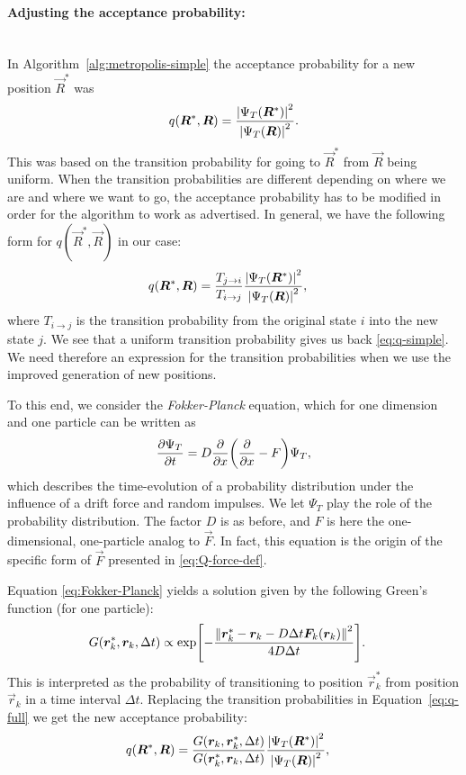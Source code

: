 \documentclass[twocolumn]{article}
\begin{document}
\paragraph{Adjusting the acceptance probability:}$\,$\\
In Algorithm~\ref{alg:metropolis-simple} the acceptance probability for a new
position $\vec R^*$ was
\begin{align}
    q(\bm R^*, \bm R) = \frac{\abs{\Psi_T(\bm R^*)}^2}{\abs{\Psi_T(\bm
    R)}^2}\label{eq:q-simple}.
\end{align}
This was based on the transition probability for going to $\vec R^*$ from $\vec
R$ being uniform. When the transition probabilities are different depending on 
where we are and where we want to go, the acceptance probability has to be
modified in order for the algorithm to work as advertised. In general, we have 
the following form for $q(\vec R^*, \vec R)$ in our case:
\begin{align}
    q(\bm R^*, \bm R) &= \frac{T_{j\rightarrow i}}{T_{i\rightarrow j}}\frac{\abs{\Psi_T(\bm R^*)}^2}{\abs{\Psi_T(\bm
    R)}^2},\label{eq:q-full}
\end{align}
where $T_{i\rightarrow j}$ is the transition probability from the original state
$i$ into the new state $j$. We see that a uniform transition probability gives
us back \eqref{eq:q-simple}. We need therefore an expression for the transition
probabilities when we use the improved generation of new positions.


To this end, we consider the \textit{Fokker-Planck} equation, which for one
dimension and one particle can be written as
\begin{align}
    \pdv{\Psi_T}{t} = D\pdv{}{x}\qty(\pdv{}{x} - F)\Psi_T,\label{eq:Fokker-Planck}
\end{align}
which describes the time-evolution of a probability distribution under the
influence of a drift force and random impulses. We let $\Psi_T$ play the role of the
probability distribution. The factor $D$ is as before, and $F$ is here the
one-dimensional, one-particle analog to $\vec F$. In
fact, this equation is the origin of the specific form of $\vec F$ presented in
\eqref{eq:Q-force-def}. 

Equation \eqref{eq:Fokker-Planck} yields a solution given by
the following Green's function (for one particle):
\begin{align}
    G(\bm r_k^*, \bm r_k, \Delta t) &\propto 
    \exp[- \frac{\norm{\bm r_k^* - \bm r_k - D\Delta t \bm F_k(\bm r_k)}^2}{4D\Delta t} ].
\end{align}
This is interpreted as the probability of transitioning to position $\vec r_k^*$
from position $\vec r_k$ in a time interval $\Delta t$. Replacing the transition
probabilities in Equation~\eqref{eq:q-full} we get the new acceptance
probability:
\begin{align}
    q(\bm R^*, \bm R) &= \frac{G(\bm r_k, \bm r_k^*, \Delta t)}{G(\bm r_k^*, \bm r_k, \Delta t)}\frac{\abs{\Psi_T(\bm R^*)}^2}{\abs{\Psi_T(\bm
    R)}^2},\label{eq:q-full}
\end{align}
\end{document}
